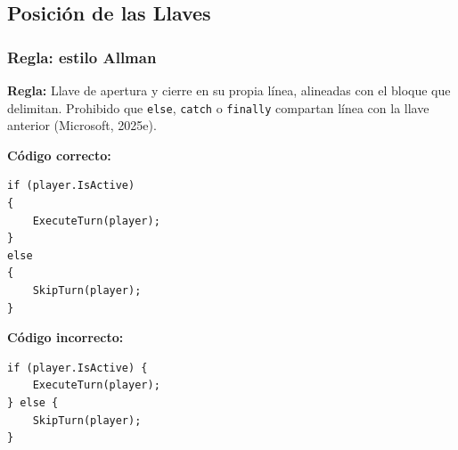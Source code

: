 \subsection{Posición de las Llaves}

\subsubsection{Regla: estilo Allman}

\textbf{Regla:} Llave de apertura y cierre en su propia línea, alineadas con el bloque que delimitan. Prohibido que \texttt{else}, \texttt{catch} o \texttt{finally} compartan línea con la llave anterior (Microsoft, 2025e).

\textbf{Código correcto:}
\begin{lstlisting}[style=csharpstyle]
if (player.IsActive)
{
    ExecuteTurn(player);
}
else
{
    SkipTurn(player);
}
\end{lstlisting}

\textbf{Código incorrecto:}
\begin{lstlisting}[style=csharpstyle]
if (player.IsActive) {
    ExecuteTurn(player);
} else {
    SkipTurn(player);
}
\end{lstlisting}
